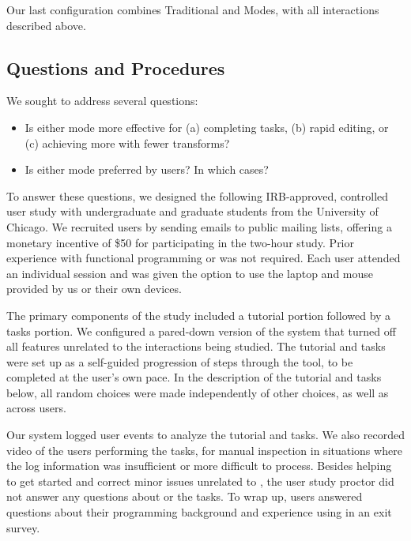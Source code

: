 
Our last configuration combines Traditional and \deuce{} Modes, with all
interactions described above.

\subsection{Questions and Procedures}

We sought to address several questions:

\begin{itemize}

\item Is either mode more effective for (a) completing tasks, (b) rapid editing, or (c) achieving more with fewer transforms?
\item Is either mode preferred by users? In which cases?

\end{itemize}

\noindent
To answer these questions, we designed the following IRB-approved, controlled
user study with \numUsers{} undergraduate and graduate students from the
University of Chicago.
%
We recruited users by sending emails to public mailing lists, offering
a monetary incentive of \$50 for participating in the two-hour study. Prior
experience with functional programming or \sns{} was not required. Each user
attended an individual session and was given the option to use the laptop and
mouse provided by us or their own devices.

The primary components of the study included a tutorial portion followed by a
tasks portion. We configured a pared-down version of the system that turned off
all \sns{} features unrelated to the interactions being studied. The tutorial
and tasks were set up as a self-guided progression of steps through the tool, to
be completed at the user's own pace.
%
In the description of the tutorial and tasks below, all random choices were
made independently of other choices, as well as across users.

Our system logged user events to analyze the tutorial and tasks. We also
recorded video of the users performing the tasks, for manual inspection
in situations where the log information was insufficient or
more difficult to process. Besides helping to get started and correct minor
issues unrelated to \deuce{}, the user study proctor did not answer any
questions about \deuce{} or the tasks.
%
To wrap up, users answered questions about their programming background and
experience using \deuce{} in an exit survey.


